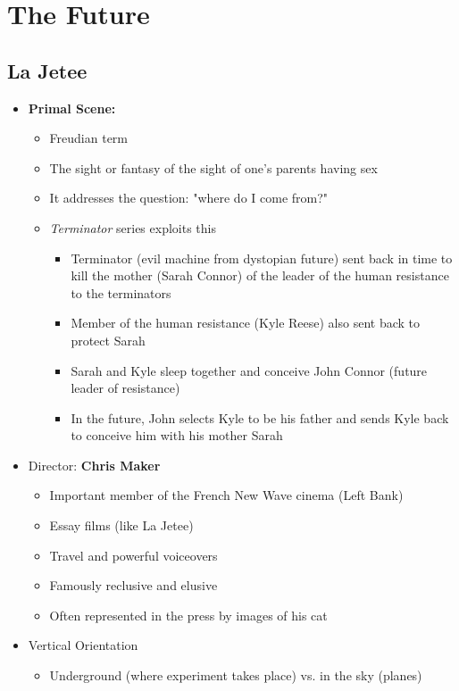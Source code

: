 \documentclass[11pt,fleqn]{book}
\begin{document}
\section{The Future}
\subsection{La Jetee}
\begin{itemize}
    \item \textbf{Primal Scene:}
    \begin{itemize}
        \item Freudian term
        \item The sight or fantasy of the sight of one's parents having sex
        \item It addresses the question: "where do I come from?"
        \item \textit{Terminator} series exploits this
        \begin{itemize}
            \item Terminator (evil machine from dystopian future) sent back in time to kill
the mother (Sarah Connor) of the leader of the human resistance to the
terminators
            \item Member of the human resistance (Kyle Reese) also sent back to protect
Sarah
            \item  Sarah and Kyle sleep together and conceive John Connor (future leader of
resistance)
            \item  In the future, John selects Kyle to be his father and sends Kyle back to
conceive him with his mother Sarah
        \end{itemize}
    \end{itemize}
    \item Director: \textbf{Chris Maker}
    \begin{itemize}
        \item Important member of the French New Wave cinema (Left Bank)
        \item Essay films (like La Jetee)
        \item Travel and powerful voiceovers
        \item Famously reclusive and elusive
        \item Often represented in the press by images of his cat
    \end{itemize}
    \item Vertical Orientation
    \begin{itemize}
        \item Underground (where experiment takes place) vs. in the sky (planes)

\end{itemize}
\end{itemize}
\end{document}
